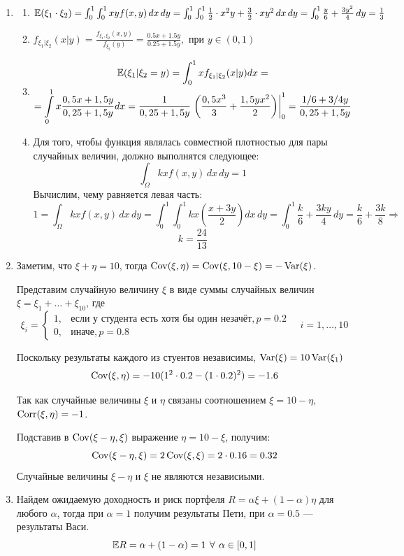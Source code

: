 \begin{enumerate}
\item
\begin{enumerate}
\item $ \mathbb{E}({\xi_1 \cdot \xi_2}) = \int_{0}^1 \int_0^1 xy f(x,y) \, dx \, dy = \int_0^1 \int_0^1 \frac{1}{2}\cdot x^2y + \frac{3}{2}\cdot xy^2 \, dx \, dy = \int_{0}^1 \frac{y}{6} + \frac{3y^2}{4} \,dy = \frac{1}{3}$
\item $f_{\xi_1 | \xi_2} (x | y) = \frac{f_{\xi_1, \xi_2}(x, y)}{f_{\xi_2}(y)} = \frac{0.5x + 1.5y}{0.25 + 1.5y}, \text{ при } y \in (0,1)$
\item
\begin{multline*}
\mathbb{E}(\xi_1 | \xi_2 = y) = \int_0^1 x f_{\xi_1 | \xi_2} (x | y) dx = \\
= \int\limits_{0}^{1}  x \frac{0,5x + 1,5y}{0,25 + 1,5y} dx = \frac{1}{0,25 + 1,5y}  \left. \left( \dfrac{0,5x^3}{3} +  \dfrac{1,5yx^2}{2} \right) \right|_0^1  =  \frac{1/6 + 3/4y}{0,25 + 1,5y}
\end{multline*}
\item
Для того, чтобы функция являлась совместной плотностью для пары случайных величин, должно выполнятся следующее:
\[
\int_{\Omega} kx f(x,y) \, dx \, dy = 1
\]
Вычислим, чему равняется левая часть:
\[
1 = \int_{\Omega} kx f(x,y) \, dx \, dy = \int_{0}^1 \int_{0}^1 kx \left(\frac{x + 3y}{2}\right) dx \, dy = \int_{0}^1 \frac{k}{6} + \frac{3ky}{4} \, dy = \frac{k}{6} + \frac{3k}{8} \Rightarrow
\]
\[
k = \frac{24}{13}
\]
\end{enumerate}
\item Заметим, что $\xi + \eta = 10$, тогда $\operatorname{Cov}(\xi, \eta) = \operatorname{Cov}(\xi, 10-\xi) = -\operatorname{Var}(\xi)$.

Представим случайную величину $\xi$ в виде суммы случайных величин $\xi = \xi_1 + \ldots + \xi_{10}$, где
\[
\xi_i = \begin{cases}
1, & \text{если у студента есть хотя бы один незачёт}, p=0.2 \\
0, & \text{иначе}, p=0.8
\end{cases} \quad i = 1, \ldots, 10
\]

Поскольку результаты каждого из стуентов независимы, $\operatorname{Var}(\xi) = 10\operatorname{Var}(\xi_1)$
\[
\operatorname{Cov}(\xi, \eta) = -10(1^2 \cdot 0.2 - (1\cdot 0.2)^2) = -1.6
\]

Так как случайные величины $\xi$ и $\eta$ связаны соотношением $\xi = 10 - \eta$, $\operatorname{Corr}(\xi, \eta)=-1$.

Подставив в $\operatorname{Cov}(\xi - \eta, \xi)$ выражение $\eta = 10 - \xi$, получим:
\[
\operatorname{Cov}(\xi - \eta, \xi) = 2 \operatorname{Cov}(\xi, \xi) = 2 \cdot 0.16 = 0.32
\]
Случайные величины $\xi - \eta$ и $\xi$ не являются независиыми.
\item Найдем ожидаемую доходность и риск портфеля $R = \alpha \xi + (1-\alpha) \eta$ для любого $\alpha$, тогда при $\alpha = 1$ получим результаты Пети, при $\alpha = 0.5$ — результаты Васи.
\[
\mathbb{E} R = \alpha + (1-\alpha) = 1 \: \, \forall \, \: \alpha \in [0,1]
\]


\end{enumerate}
